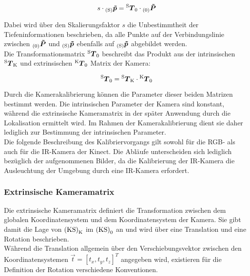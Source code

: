\begin{equation}
s \cdot {_{{\mathrm{(S)}}}}\mbox{\boldmath{$\tilde{p}$}} = {^{\mathrm{S}}\mbox{\boldmath{$T$}}_{\mathrm{0}}} \cdot {_{{\mathrm{(0)}}}}\mbox{\boldmath{$\tilde{P}$}}
\label{eq.persp_abb}
\end{equation}


Dabei wird über den Skalierungsfaktor $s$ die Unbestimmtheit der Tiefeninformationen beschrieben, da alle Punkte auf der Verbindungslinie zwischen ${_{{\mathrm{(0)}}}}\mbox{\boldmath{$\tilde{P}$}}$ und ${_{{\mathrm{(S)}}}}\mbox{\boldmath{$\tilde{p}$}}$ ebenfalls auf ${_{{\mathrm{(S)}}}}\mbox{\boldmath{$\tilde{p}$}}$ abgebildet werden.\\ 
Die Transformationsmatrix ${^{\mathrm{S}}\mbox{\boldmath{$T$}}_{\mathrm{0}}}$ beschreibt das Produkt aus der intrinsischen ${^{\mathrm{S}}\mbox{\boldmath{$T$}}_{\mathrm{K}}}$ und extrinsischen ${^{\mathrm{K}}\mbox{\boldmath{$T$}}_{\mathrm{0}}}$ Matrix der Kamera:

\begin{equation}
{^{\mathrm{S}}\mbox{\boldmath{$T$}}_{\mathrm{0}}} = {^{\mathrm{S}}\mbox{\boldmath{$T$}}_{\mathrm{K}}} \cdot {^{\mathrm{K}}\mbox{\boldmath{$T$}}_{\mathrm{0}}}
\end{equation}

Durch die Kamerakalibrierung können die Parameter dieser beiden Matrizen bestimmt werden. Die intrinsischen Parameter der Kamera sind konstant, während die extrinsische Kameramatrix in der später Anwendung durch die Lokalisation ermittelt wird. Im Rahmen der Kamerakalibrierung dient sie daher lediglich zur Bestimmung der intrinsischen Parameter.\\
Die folgende Beschreibung des Kalibriervorgangs gilt sowohl für die RGB- als auch für die IR-Kamera der Kinect. Die Abläufe unterscheiden sich lediglich bezüglich der aufgenommenen Bilder, da die Kalibrierung der IR-Kamera die Ausleuchtung der Umgebung durch eine IR-Kamera erfordert.

\subsubsection{Extrinsische Kameramatrix}
\label{chap.perspproj}
Die extrinsische Kameramatrix definiert die Transformation zwischen dem globalen Koordinatensystem und dem Koordinatensystem der Kamera. Sie gibt damit die Lage von ${\mathrm{(KS)}}_{\mathrm{K}}$ im ${\mathrm{(KS)}}_{\mathrm{0}}$ an und wird über eine Translation und eine Rotation beschrieben.\\
Während die Translation allgemein über den Verschiebungsvektor zwischen den Koordinatensystemen $\vec{t} = [t_x, t_y, t_z]^T$ angegeben wird, existieren für die Definition der Rotation verschiedene Konventionen.\\

